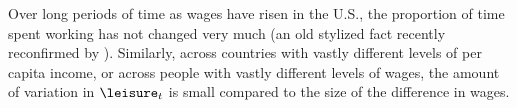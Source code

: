 





Over long periods of time as wages have risen in the U.S., the proportion
of time spent working has not changed very much (an old stylized fact recently reconfirmed by \cite{rameyFrancisLeisure}).  Similarly, across
countries with vastly different levels of per capita income, or across
people with vastly different levels of wages, the amount of
variation in $\leisure_{t}$ is small compared to the size of the difference
in wages.

